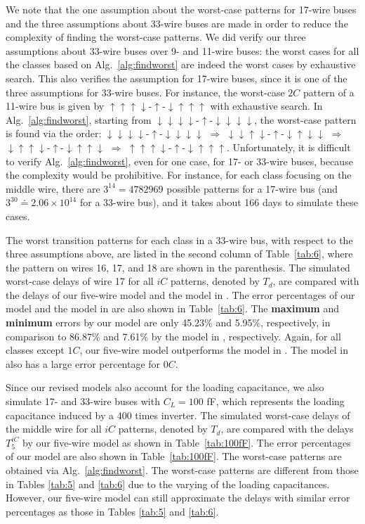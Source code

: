 \documentclass[10pt,journal]{IEEEtran}
\def\d{\downarrow}
\def\u{\uparrow}
\begin{document}
We note that the one assumption about the worst-case patterns for 17-wire buses and the three assumptions about 33-wire buses are made in order to reduce the complexity of finding the worst-case patterns. We did verify our three assumptions about 33-wire buses over 9- and 11-wire buses: the worst cases for all the classes based on Alg.~\ref{alg:findworst} are indeed the worst cases by exhaustive search.
This also verifies the assumption for 17-wire buses, since it is one of the three assumptions for 33-wire buses.
For instance, the worst-case $2C$ pattern of a 11-wire bus is given by $\u\u\u\d$-$\u$-$\d\u\u\u$ with exhaustive search. In Alg.~\ref{alg:findworst}, starting from $\d\d\d\d$-$\u$-$\d\d\d\d$, the worst-case pattern is found via the order: $\d\d\d\d$-$\u$-$\d\d\d\d$ $\Longrightarrow$ $\d\d\u\d$-$\u$-$\d\u\d\d$ $\Longrightarrow$ $\d\u\u\d$-$\u$-$\d\u\u\d$ $\Longrightarrow$ $\u\u\u\d$-$\u$-$\d\u\u\u$.
Unfortunately, it is difficult to verify Alg.~\ref{alg:findworst}, even for one case, for 17- or 33-wire buses, because the complexity would be prohibitive. For instance, for each class focusing on the middle wire, there are $3^{14}=4782969$ possible patterns for a 17-wire bus (and $3^{30}\doteq 2.06\times 10^{14}$ for a 33-wire bus), and it takes about 166 days to simulate these cases.





The worst transition patterns for each class in a 33-wire bus, with respect to the three assumptions above, are listed in the second column of Table~\ref{tab:6}, where the pattern on wires 16, 17, and 18 are shown in the parenthesis.
The simulated worst-case delays of wire 17 for all $iC$ patterns, denoted by $T_d$, are compared with the delays of our five-wire model and the model in \cite{Sot01}. The error percentages of our model and the model in \cite{Sot01} are also shown in Table~\ref{tab:6}. The \textbf{maximum} and \textbf{minimum} errors by our model are only 45.23\% and 5.95\%, respectively, in comparison to 86.87\% and 7.61\% by the model in \cite{Sot01}, respectively. Again, for all classes except $1C$, our five-wire model outperforms the model in \cite{Sot01}. The model in \cite{Sot01} also has a large error percentage for $0C$.

Since our revised models also account for the loading capacitance, we also simulate 17- and 33-wire buses with $C_L = 100$ fF, which represents the loading capacitance induced by a 400 times inverter. The simulated worst-case delays of the middle wire for all $iC$ patterns, denoted by $T_d$, are compared with the delays $T_5^{iC}$ by our five-wire model as shown in Table~\ref{tab:100fF}. The error percentages of our model are also shown in Table~\ref{tab:100fF}. The worst-case patterns are obtained via Alg.~\ref{alg:findworst}. The worst-case patterns are different from those in Tables \ref{tab:5} and \ref{tab:6} due to the varying of the loading capacitances. However, our five-wire model can still approximate the delays with similar error percentages as those in Tables \ref{tab:5} and \ref{tab:6}.
\end{document}
